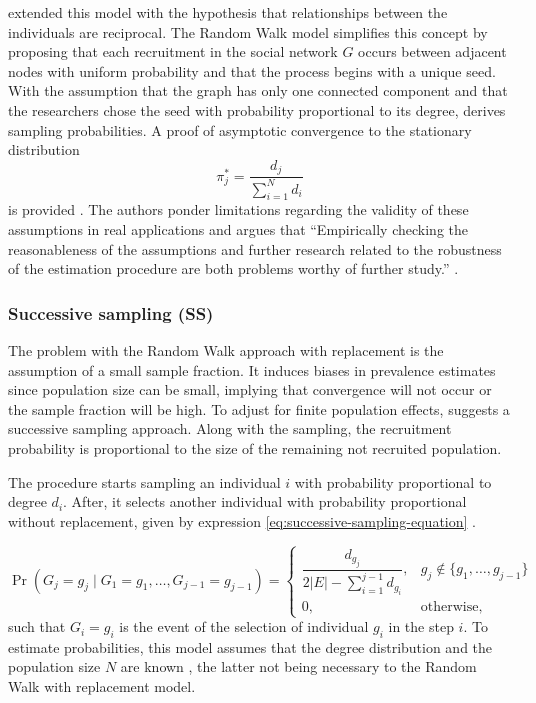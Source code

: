\textcite[p.22]{heckathorn2002} extended this model with the hypothesis that relationships between
the individuals are reciprocal. The Random Walk model simplifies this concept
by proposing that each recruitment in the social network $G$ occurs between
adjacent nodes with uniform probability and that the process begins with a
unique seed. With the assumption that the graph has only one connected
component and that the researchers chose the seed with probability
proportional to its degree, \textcite[p. 209-218]{salganik2004sampling}
derives sampling probabilities. A proof of asymptotic convergence to the stationary
distribution 
\begin{equation}
  \pi_j^{*} = \frac{d_j}{\sum_{i=1}^N d_i}
\end{equation}
is provided \cite[p. 234-235]{salganik2004sampling}. The authors ponder
limitations regarding the validity of these assumptions in real applications
and argues that ``Empirically checking the reasonableness of the assumptions and further 
research related to the robustness of the estimation procedure are
both problems worthy of further study.'' \cite[p. 230]{salganik2004sampling}.

\subsubsection{Successive sampling (SS)}

The problem with the Random Walk approach with replacement is the assumption
of a small sample fraction. It induces biases in prevalence estimates since
population size can be small, implying that convergence will not occur or the
sample fraction will be high. To adjust for finite population effects,
\textcite{gile2011improved} suggests a successive sampling approach. Along
with the sampling, the recruitment probability is proportional to the size of
the remaining not recruited population.  

The procedure starts sampling an individual $i$ with probability proportional to
degree $d_i$. After, it selects another individual with probability
proportional without replacement, given by expression \eqref{eq:successive-sampling-equation} \cite[p.
136]{gile2011improved}.

\begin{equation}
  \label{eq:successive-sampling-equation}
  \Pr(G_j = g_j \mid G_1 = g_1, \dots, G_{j-1} = g_{j-1}) = \begin{cases}
    \dfrac{d_{g_j}}{2|E| - \sum_{i=1}^{j-1} d_{g_i}}, &g_j \not\in \{g_1, \dots, g_{j-1}\} \\
    0, &\text{otherwise}, 
  \end{cases}
\end{equation}
such that $G_i = g_i$ is the event of the selection of individual $g_i$ in the
step $i$. To estimate probabilities, this model assumes that the degree distribution and the
population size $N$ are known \cite[Table 2, p. 144]{gile2011improved}, the
latter not being necessary to the Random Walk with replacement model. 


